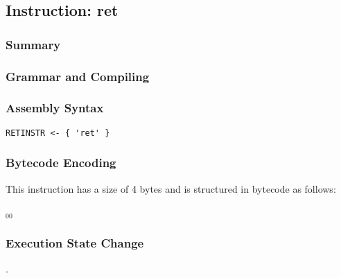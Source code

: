 \subsection{Instruction: ret}

\subsubsection{Summary}


\subsubsection{Grammar and Compiling}


\subsubsection{Assembly Syntax}

\begin{myquote}
\begin{verbatim}
RETINSTR <- { 'ret' }
\end{verbatim}
\end{myquote}

\subsubsection{Bytecode Encoding}

This instruction has a size of 4 bytes and is structured in bytecode as follows:

$_{00}$\ 


\subsubsection{Execution State Change}

.


